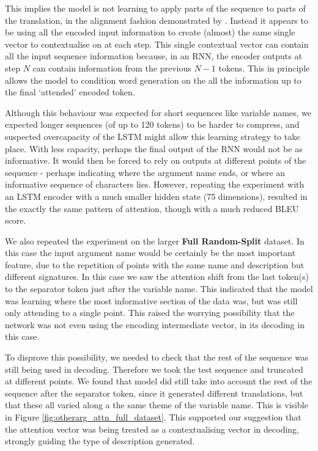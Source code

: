 This implies the model is not learning to apply parts of the sequence to parts of the translation, in the alignment fashion demonstrated by \citet{bahdanau_neural_2014}. Instead it appears to be using all the encoded input information to create (almost) the same single vector to contextualise on at each step.
This single contextual vector can contain all the input sequence information because, in an RNN, the encoder outputs at step $N$ can contain information from the previous $N-1$ tokens. This in principle allows the model to condition word generation on the all the information up to the final `attended' encoded token. 

Although this behaviour was expected for short sequences like variable names, we expected longer sequences (of up to 120 tokens) to be harder to compress, and suspected overcapacity of the LSTM might allow this learning strategy to take place. 
With less capacity, perhaps the final output of the RNN would not be as informative. It would then be forced to rely on outputs at different points of the sequence - perhaps indicating where the argument name ends, or where an informative sequence of characters lies.
However, repeating the experiment with an LSTM encoder with a much smaller hidden state (75 dimensions), resulted in the exactly the same pattern of attention, though with a much reduced BLEU score.

We also repeated the experiment on the larger \textbf{Full Random-Split} dataset. In this case the input argument name would be certainly be the most important feature, due to the repetition of points with the same name and description but different signatures. 
In this case we saw the attention shift from the last token(s) to the separator token just after the variable name. This indicated that the model was learning where the most informative section of the data was, but was still only attending to a single point.
This raised the worrying possibility that the network was not even using the encoding intermediate vector, in its decoding in this case.

To disprove this possibility, we needed to check that the rest of the sequence was still being used in decoding. Therefore we took the test sequence and truncated at different points. We found that model did still take into account the rest of the sequence after the separator token, since it generated different translations, but that these all varied along a the same theme of the variable name. This is visible in Figure \ref{fig:otherarg_attn_full_dataset}. This supported our suggestion that the attention vector was being treated as a contextualising vector in decoding, strongly guiding the type of description generated.


